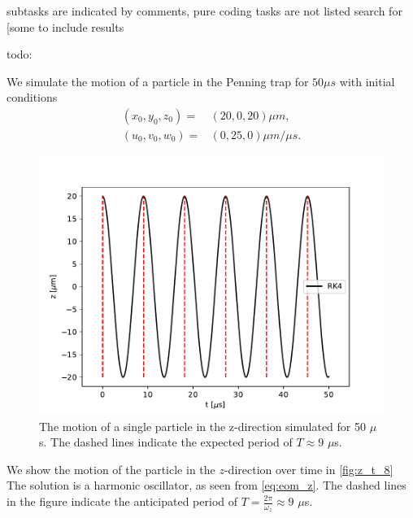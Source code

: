 subtasks are indicated by comments,
pure coding tasks are not listed
search for [some to include results


todo:


We simulate the motion of a particle in the Penning trap for $50 \mu s$ with initial conditions
\begin{align}
  (x_0, y_0, z_0) =& (20, 0, 20)\mu m, \\
  (u_0, v_0, w_0) =& (0, 25, 0) \mu m / \mu s.
\end{align}


\begin{figure}
\centering
\includegraphics[scale = 1]{../figures/z_t_.pdf}
\caption{The motion of a single particle in the z-direction simulated for 50 $\mu$s. The dashed lines indicate the expected period of $T \approx 9$ $\mu$s.}
\label{fig:z_t_8}
\end{figure}

We show the motion of the particle in the $z$-direction over time in \autoref{fig:z_t_8}
The solution is a harmonic oscillator, as seen from \autoref{eq:eom_z}. The dashed lines in the figure indicate the anticipated period of $T = \frac{2\pi}{\omega_z} \approx 9$ $\mu$s.

